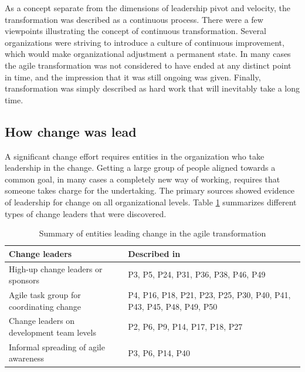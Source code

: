 As a concept separate from the dimensions of leadership pivot and velocity, the
transformation was described as a continuous process. There were a few
viewpoints illustrating the concept of continuous transformation. Several
organizations were striving to introduce a culture of continuous improvement,
which would make organizational adjustment a permanent state. In many cases the
agile transformation was not considered to have ended at any distinct point in
time, and the impression that it was still ongoing was given. Finally,
transformation was simply described as hard work that will inevitably take a
long time.















\subsection{How change was lead}

A significant change effort requires entities in the organization who take
leadership in the change. Getting a large group of people aligned towards a
common goal, in many cases a completely new way of working, requires that
someone takes charge for the undertaking. The primary sources showed evidence of
leadership for change on all organizational levels. Table
\ref{table:transformation_leadership} summarizes different types of change
leaders that were discovered.

\begin{table}[h]
    \centering
    \begin{tabular}{ >{\raggedright\arraybackslash}p{}
                     >{\raggedright\arraybackslash}p{} }
        \toprule
        Change leaders         &  Described in  \\
        \midrule
        High-up change leaders or sponsors  &
                P3, P5, P24, P31, P36, P38, P46, P49  \\
        Agile task group for coordinating change   &
                P4, P16, P18, P21, P23, P25, P30, P40, P41,
                P43, P45, P48, P49, P50  \\
        Change leaders on development team levels  &
                P2, P6, P9, P14, P17, P18, P27  \\
        Informal spreading of agile awareness  &
                P3, P6, P14, P40  \\
        \bottomrule
    \end{tabular}
    \caption{Summary of entities leading change in the agile transformation}
    \label{table:transformation_leadership}
\end{table}


